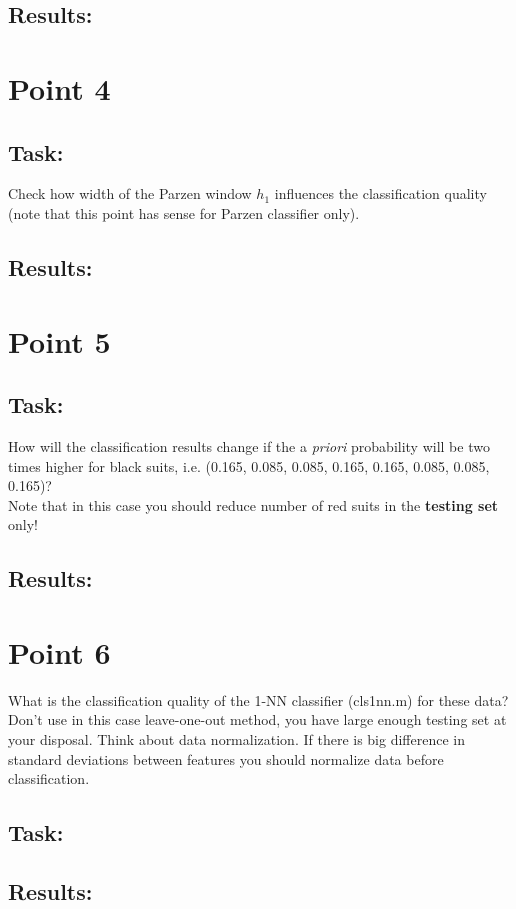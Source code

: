 \documentclass[
  a4paper,            %
  DIV=10,             %
  oneside,            %
  BCOR=5mm,           %
  parskip=half,       %
  numbers=noenddot,   %
  bibtotoc,           %
  listof=totoc        %
]{scrreprt}
\begin{document}
\subsection*{Results:}

\section*{Point 4}
\subsection*{Task:}
Check how width of the Parzen window $h_{1}$ influences the classification quality (note that this point has sense for Parzen classifier only).
\subsection*{Results:}

\section*{Point 5}
\subsection*{Task:}
How will the classification results change if the a \textit{priori} probability will be two times higher for black suits, i.e. (0.165, 0.085, 0.085, 0.165, 0.165, 0.085, 0.085, 0.165)?
\\
Note that in this case you should reduce number of red suits in the \textbf{testing set} only!
\subsection*{Results:}

\section*{Point 6}
What is the classification quality of the 1-NN classifier (cls1nn.m) for these data?
\\
Don't use in this case leave-one-out method, you have large enough testing set at your disposal.
Think about data normalization.
If there is big difference in standard deviations between features you should normalize data before classification.
\subsection*{Task:}
\subsection*{Results:}
\end{document}
